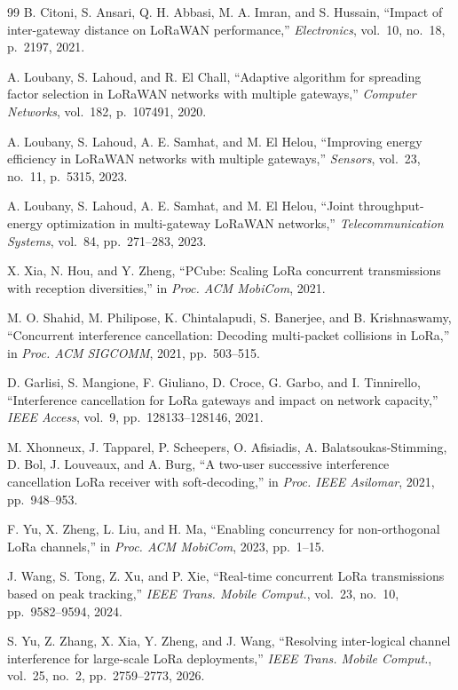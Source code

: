 \documentclass[journal]{IEEEtran}
\begin{document}
\begin{thebibliography}{99}
B. Citoni, S. Ansari, Q. H. Abbasi, M. A. Imran, and S. Hussain, ``Impact of inter-gateway distance on LoRaWAN performance,'' \emph{Electronics}, vol.\ 10, no.\ 18, p.\ 2197, 2021.

A. Loubany, S. Lahoud, and R. El Chall, ``Adaptive algorithm for spreading factor selection in LoRaWAN networks with multiple gateways,'' \emph{Computer Networks}, vol.\ 182, p.\ 107491, 2020.

A. Loubany, S. Lahoud, A. E. Samhat, and M. El Helou, ``Improving energy efficiency in LoRaWAN networks with multiple gateways,'' \emph{Sensors}, vol.\ 23, no.\ 11, p.\ 5315, 2023.

A. Loubany, S. Lahoud, A. E. Samhat, and M. El Helou, ``Joint throughput-energy optimization in multi-gateway LoRaWAN networks,'' \emph{Telecommunication Systems}, vol.\ 84, pp.\ 271--283, 2023.

X. Xia, N. Hou, and Y. Zheng, ``PCube: Scaling LoRa concurrent transmissions with reception diversities,'' in \emph{Proc. ACM MobiCom}, 2021.

M. O. Shahid, M. Philipose, K. Chintalapudi, S. Banerjee, and B. Krishnaswamy, ``Concurrent interference cancellation: Decoding multi-packet collisions in LoRa,'' in \emph{Proc. ACM SIGCOMM}, 2021, pp.\ 503--515.

D. Garlisi, S. Mangione, F. Giuliano, D. Croce, G. Garbo, and I. Tinnirello, ``Interference cancellation for LoRa gateways and impact on network capacity,'' \emph{IEEE Access}, vol.\ 9, pp.\ 128133--128146, 2021.

M. Xhonneux, J. Tapparel, P. Scheepers, O. Afisiadis, A. Balatsoukas-Stimming, D. Bol, J. Louveaux, and A. Burg, ``A two-user successive interference cancellation LoRa receiver with soft-decoding,'' in \emph{Proc. IEEE Asilomar}, 2021, pp.\ 948--953.

F. Yu, X. Zheng, L. Liu, and H. Ma, ``Enabling concurrency for non-orthogonal LoRa channels,'' in \emph{Proc. ACM MobiCom}, 2023, pp.\ 1--15.

J. Wang, S. Tong, Z. Xu, and P. Xie, ``Real-time concurrent LoRa transmissions based on peak tracking,'' \emph{IEEE Trans. Mobile Comput.}, vol.\ 23, no.\ 10, pp.\ 9582--9594, 2024.

S. Yu, Z. Zhang, X. Xia, Y. Zheng, and J. Wang, ``Resolving inter-logical channel interference for large-scale LoRa deployments,'' \emph{IEEE Trans. Mobile Comput.}, vol.\ 25, no.\ 2, pp.\ 2759--2773, 2026.


\end{thebibliography}
\end{document}
